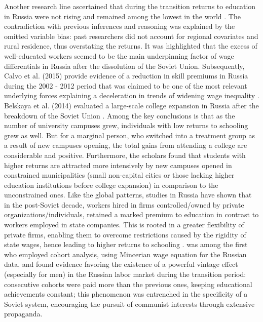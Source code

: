 \documentclass[alpha-refs]{wiley-article-01g}
\begin{document}
Another research line ascertained that during the transition returns to education in Russia were not rising and remained among the lowest in the world \parencite{Cheidvasser2007}. The contradiction with previous inferences and reasoning was explained by the omitted variable bias: past researchers did not account for regional covariates and rural residence, thus overstating the returns. It was highlighted that the excess of well-educated workers seemed to be the main underpinning factor of wage differentials in Russia after the dissolution of the Soviet Union. Subsequently, Calvo et al. (2015) provide evidence of a reduction in skill premiums in Russia during the 2002 - 2012 period that was claimed to be one of the most relevant underlying forces explaining a deceleration in trends of widening wage inequality \parencite{Calvo2015}. Belskaya et al. (2014) evaluated a large-scale college expansion in Russia after the breakdown of the Soviet Union \parencite{Belskaya2014}. Among the key conclusions is that as the number of university campuses grew, individuals with low returns to schooling grew as well. But for a marginal person, who switched into a treatment group as a result of new campuses opening, the total gains from attending a college are considerable and positive. Furthermore, the scholars found that students with higher returns are attracted more intensively by new campuses opened in constrained municipalities (small non-capital cities or those lacking higher education institutions before college expansion) in comparison to the unconstrained ones. Like the global patterns, studies in Russia have shown that in the post-Soviet decade, workers hired in firms controlled\slash owned by private organizations\slash individuals, retained a marked premium to education in contrast to workers employed in state companies. This is rooted in a greater flexibility of private firms, enabling them to overcome restrictions caused by the rigidity of state wages, hence leading to higher returns to schooling \parencite{Clark2003}. \cite{Borisov2007} was among the first who employed cohort analysis, using Mincerian wage equation for the Russian data, and found evidence favoring the existence of a powerful vintage effect (especially for men) in the Russian labor market during the transition period: consecutive cohorts were paid more than the previous ones, keeping educational achievements constant; this phenomenon was entrenched in the specificity of a Soviet system, encouraging the pursuit of communist interests through extensive propaganda.
\end{document}
